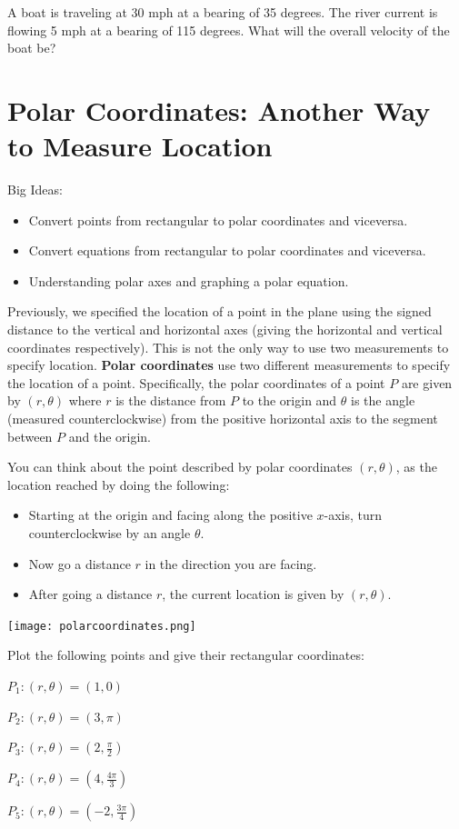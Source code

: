 \bq A boat is traveling at 30 mph at a bearing of 35 degrees. The river current is flowing 5 mph at a bearing of 115 degrees. What will the overall velocity of the boat be?
\eq

\section{Polar Coordinates: Another Way to Measure Location}
Big Ideas:
\begin{itemize}
\item Convert points from rectangular to polar coordinates and viceversa.
\item Convert equations from rectangular to polar coordinates and viceversa.
\item Understanding polar axes and graphing a polar equation.
\end{itemize}

\begin{info}
Previously, we specified the location of a point in the plane using the signed distance to the vertical and horizontal axes (giving the horizontal and vertical coordinates respectively). This is not the only way to use two measurements to specify location. \textbf{Polar coordinates} use two different measurements to specify the location of a point. Specifically, the polar coordinates of a point $P$ are given by $(r,\theta)$ where $r$ is the distance from $P$ to the origin and $\theta$ is the angle (measured counterclockwise) from the positive horizontal axis to the segment between $P$ and the origin.

You can think about the point described by polar coordinates $(r,\theta)$, as the location reached by doing the following:
\begin{itemize}
\item Starting at the origin and facing along the positive $x$-axis, turn counterclockwise by an angle $\theta$.
\item Now go a distance $r$ in the direction you are facing.
\item After going a distance $r$, the current location is given by $(r,\theta)$.
\end{itemize}
\begin{center} \texttt{[image: polarcoordinates.png]} \end{center}
\end{info}

\bq Plot the following points and give their rectangular coordinates:
\be
\item $P_1:(r, \theta)=(1,0) $
\item $P_2:(r, \theta)=(3,\pi)$
\item $P_3:(r, \theta)=(2,\frac{\pi}{2})$
\item $P_4:(r, \theta)=(4, \frac{4\pi}{3})$
\item $P_5:(r, \theta)=(-2, \frac{3 \pi}{4})$
\ee
\eq

